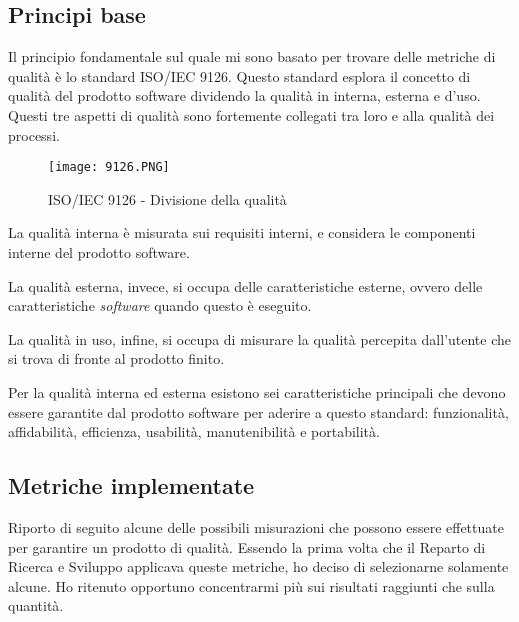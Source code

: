 \subsection{Principi base}
Il principio fondamentale sul quale mi sono basato per trovare delle metriche di qualità è lo standard ISO/IEC 9126.
Questo standard esplora il concetto di qualità del prodotto software dividendo la qualità in interna, esterna e d'uso. Questi tre aspetti di qualità sono fortemente collegati tra loro e alla qualità dei processi.

\begin{figure}[H]
  \centering
  \texttt{[image: 9126.PNG]}
  \caption{ISO/IEC 9126 - Divisione della qualità}
\end{figure}

La qualità interna è misurata sui requisiti interni, e considera le componenti interne del prodotto software.

La qualità esterna, invece, si occupa delle caratteristiche esterne, ovvero delle caratteristiche \textit{software} quando questo è eseguito.

La qualità in uso, infine, si occupa di misurare la qualità percepita dall'utente che si trova di fronte al prodotto finito.

Per la qualità interna ed esterna esistono sei caratteristiche principali che devono essere garantite dal prodotto software per aderire a questo standard: funzionalità, affidabilità, efficienza, usabilità, manutenibilità e portabilità.

\subsection{Metriche implementate}
Riporto di seguito alcune delle possibili misurazioni che possono essere effettuate per garantire un prodotto di qualità. Essendo la prima volta che il Reparto di Ricerca e Sviluppo applicava queste metriche, ho deciso di selezionarne solamente alcune. Ho ritenuto opportuno concentrarmi più sui risultati raggiunti che sulla quantità.

